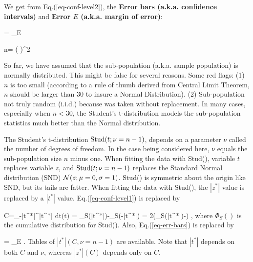 We get
from Eq.(\ref{eq-conf-level2}),
the {\bf Error bars (a.k.a. confidence intervals)}
and
{\bf Error $E$ (a.k.a. margin of error)}:



\beq
{} =
 \pm
{}_{E}
\label{eq-err-bars}
\eeq

\beq
n= \left(
\right)^2
\eeq

So far, we have assumed
that the sub-population (a.k.a. sample
population)
is normally distributed.
This might be false
for several reasons.
Some red flags: (1)
$n$ is too small (according to
a rule of thumb derived from
Central Limit Theorem, $n$
should be larger than 30
to insure a Normal Distribution).
(2) Sub-population not truly random
(i.i.d.)
because was taken
without replacement.
In many cases,
especially
when $n<30$,
the Student's t-distribution
models the sub-population statistics
much
better than the Normal distribution.


The {\rm Student's t-distribution } ${\rm Stud}(t;
\nu=n-1)$,
depends
on a parameter $\nu$
called the
number of
degrees of freedom.
In the case being considered here,
$\nu$ equals the
sub-population size $n$
minus one.
When fitting
the data with
Stud(), variable
$t$ replaces
variable $z$,
and ${\rm Stud}(t; \nu=n-1)$
replaces the Standard Normal distribution (SND)
${\cal N}(z; \mu=0, \sigma=1)$.
Stud() is symmetric about
the origin like SND,
but its tails
are fatter.
When fitting the data with Stud(),
the $|z^*|$
value is replaced
by a $|t^*|$ value.
Eq.(\ref{eq-conf-level1})
is replaced by


\beq
C=\int_{-|t^*|}^{|t^*|} dt(t) =
\Phi_S(|t^*|)-\Phi_S(-|t^*|)
=
2\left(\Phi_S(|t^*|)-\;\right)
\label{eq-conf-level1-stu}
\;,
\eeq
where $\Phi_S()$
is the cumulative
distribution for  Stud().
Also, Eq.(\ref{eq-err-bars})
is replaced  by

\beq
{} =
 \pm
{}_{E}
\;.
\eeq
Tables of $|t^*|(C,\nu=n-1)$
are available. Note
that $|t^*|$
depends on both $C$ and $\nu$,
whereas $|z^*|(C)$
depends only on $C$.

